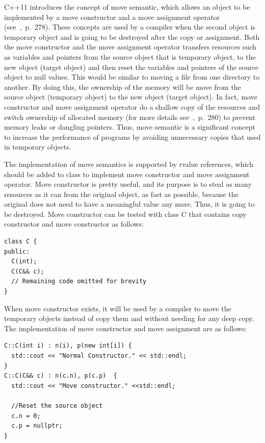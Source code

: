 \documentclass[11pt]{report}
\begin{document}
C++11 introduces the concept of move semantic, which allows an object to be implemented by a move constructor and a move assignment operator (see~\cite{Gregorie:professionalcpp},~p.~278). These concepts are used by a compiler when the second object is temporary object and is going to be destroyed after the copy or assignment. Both the move constructor and the move assignment operator transfers resources such as variables and pointers from the source object that is temporary object, to the new object (target object) and then reset the variables and pointers of the source object to null values. This would be similar to moving a file from one directory to another. By doing this, the ownership of the memory will be move from the source object (temporary object) to the new object (target object). In fact, move constructor and move assignment operator do a shallow copy of the resources and switch ownership of allocated memory (for more details see~\cite{Gregorie:professionalcpp},~p.~280) to prevent memory leaks or dangling pointers. Thus, move semantic is a significant concept to increase the performance of programs by avoiding unnecessary copies that used in temporary objects.

The implementation of move semantics is supported by rvalue references, which should be added to class to implement move constructor and move assignment operator. Move constructor is pretty useful, and its purpose is to steal as many resources as it can from the original object, as fast as possible, because the original does not need to have a meaningful value any more. Thus, it is going to be destroyed. Move constructor can be tested with class C that contains copy constructor and move constructor as follows:

\begin{lstlisting}
class C {
public:
  C(int);
  C(C&& c);
  // Remaining code omitted for brevity
}
\end{lstlisting}
When move constructor exists, it will be used by a compiler to move the temporary objects instead of copy them and without needing for any deep copy. The implementation of move constructor and move assignment are as follows:
\begin{lstlisting}
C::C(int i) : n(i), p(new int[i]) {
  std::cout << "Normal Constructor." << std::endl;
}
C::C(C&& c) : n(c.n), p(c.p)  {
  std::cout << "Move constructor." <<std::endl;

  //Reset the source object
  c.n = 0;
  c.p = nullptr;
}
\end{lstlisting}
\end{document}
